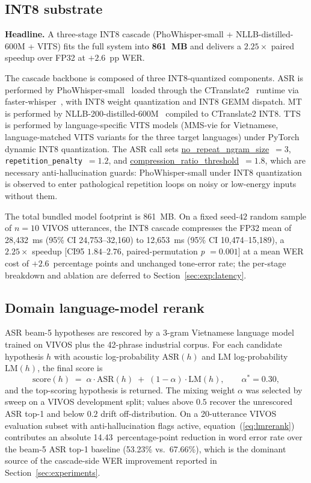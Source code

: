 \documentclass[a4paper,fleqn]{cas-dc}
\begin{document}
\subsection{INT8 substrate}\label{sec:method:int8}
\textbf{Headline.} A three-stage INT8 cascade (PhoWhisper-small + NLLB-distilled-600M + VITS) fits the full system into \textbf{861~MB} and delivers a $2.25\times$ paired speedup over FP32 at $+2.6$~pp WER.

The cascade backbone is composed of three INT8-quantized components. ASR is performed by PhoWhisper-small~\citep{le2024phowhisper} loaded through the CTranslate2~\citep{ctranslate2} runtime via faster-whisper~\citep{fasterwhisper}, with INT8 weight quantization and INT8 GEMM dispatch. MT is performed by NLLB-200-distilled-600M~\citep{nllb2022} compiled to CTranslate2 INT8. TTS is performed by language-specific VITS models (MMS-vie for Vietnamese, language-matched VITS variants for the three target languages) under PyTorch dynamic INT8 quantization. The ASR call sets \url{no_repeat_ngram_size}~$=3$, \texttt{repetition\_penalty}~$=1.2$, and \url{compression_ratio_threshold}~$=1.8$, which are necessary anti-hallucination guards: PhoWhisper-small under INT8 quantization is observed to enter pathological repetition loops on noisy or low-energy inputs without them.

The total bundled model footprint is 861~MB. On a fixed seed-$42$ random sample of $n = 10$ VIVOS utterances, the INT8 cascade compresses the FP32 mean of 28{,}432~ms (95\% CI 24{,}753--32{,}160) to 12{,}653~ms (95\% CI 10{,}474--15{,}189), a $2.25\times$ speedup [CI95 $1.84$--$2.76$, paired-permutation \textit{p} $= 0.001$] at a mean WER cost of $+2.6$~percentage points and unchanged tone-error rate; the per-stage breakdown and ablation are deferred to Section~\ref{sec:exp:latency}.

\subsection{Domain language-model rerank}\label{sec:method:lmrerank}

ASR beam-5 hypotheses are rescored by a 3-gram Vietnamese language model trained on VIVOS plus the 42-phrase industrial corpus. For each candidate hypothesis $h$ with acoustic log-probability $\mathrm{ASR}(h)$ and LM log-probability $\mathrm{LM}(h)$, the final score is
\begin{equation}
\mathrm{score}(h) \;=\; \alpha \cdot \mathrm{ASR}(h) \;+\; (1 - \alpha) \cdot \mathrm{LM}(h), \qquad \alpha^{*} = 0.30,
\label{eq:lmrerank}
\end{equation}
and the top-scoring hypothesis is returned. The mixing weight $\alpha$ was selected by sweep on a VIVOS development split; values above $0.5$ recover the unrescored ASR top-1 and below $0.2$ drift off-distribution. On a 20-utterance VIVOS evaluation subset with anti-hallucination flags active, equation~(\ref{eq:lmrerank}) contributes an absolute 14.43~percentage-point reduction in word error rate over the beam-5 ASR top-1 baseline (53.23\% vs.\ 67.66\%), which is the dominant source of the cascade-side WER improvement reported in Section~\ref{sec:experiments}.
\end{document}

